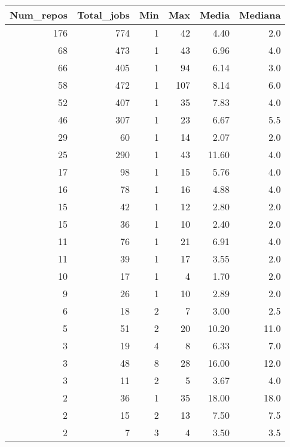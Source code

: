 \begin{tabular}{rrrrrr}
\toprule
 Num\_repos &  Total\_jobs &  Min &  Max &  Media &  Mediana \\
\midrule
       176 &         774 &    1 &   42 &   4.40 &      2.0 \\
        68 &         473 &    1 &   43 &   6.96 &      4.0 \\
        66 &         405 &    1 &   94 &   6.14 &      3.0 \\
        58 &         472 &    1 &  107 &   8.14 &      6.0 \\
        52 &         407 &    1 &   35 &   7.83 &      4.0 \\
        46 &         307 &    1 &   23 &   6.67 &      5.5 \\
        29 &          60 &    1 &   14 &   2.07 &      2.0 \\
        25 &         290 &    1 &   43 &  11.60 &      4.0 \\
        17 &          98 &    1 &   15 &   5.76 &      4.0 \\
        16 &          78 &    1 &   16 &   4.88 &      4.0 \\
        15 &          42 &    1 &   12 &   2.80 &      2.0 \\
        15 &          36 &    1 &   10 &   2.40 &      2.0 \\
        11 &          76 &    1 &   21 &   6.91 &      4.0 \\
        11 &          39 &    1 &   17 &   3.55 &      2.0 \\
        10 &          17 &    1 &    4 &   1.70 &      2.0 \\
         9 &          26 &    1 &   10 &   2.89 &      2.0 \\
         6 &          18 &    2 &    7 &   3.00 &      2.5 \\
         5 &          51 &    2 &   20 &  10.20 &     11.0 \\
         3 &          19 &    4 &    8 &   6.33 &      7.0 \\
         3 &          48 &    8 &   28 &  16.00 &     12.0 \\
         3 &          11 &    2 &    5 &   3.67 &      4.0 \\
         2 &          36 &    1 &   35 &  18.00 &     18.0 \\
         2 &          15 &    2 &   13 &   7.50 &      7.5 \\
         2 &           7 &    3 &    4 &   3.50 &      3.5 \\

\end{tabular}
